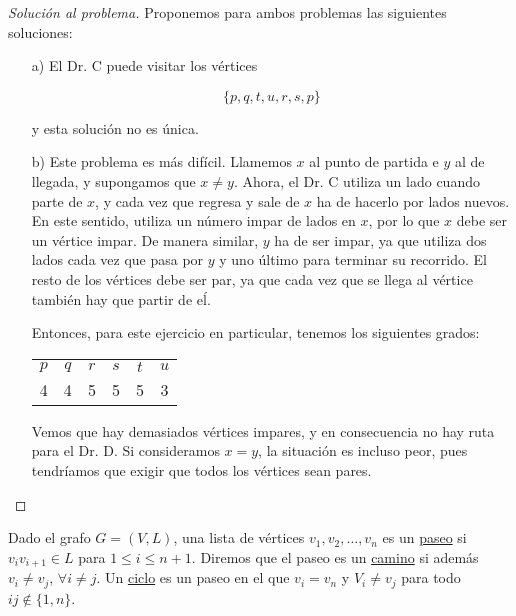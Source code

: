 \begin{proof}[Solución al problema]
    Proponemos para ambos problemas las siguientes soluciones:
    \begin{enumerate}
        \item[a)] El Dr. C puede visitar los vértices
        
        \[
        \{ p, q, t, u, r, s, p \}
        \]
        
        y esta solución no es única.
        
        \item[b)] Este problema es más difícil. Llamemos $x$ al punto de partida e $y$ al de llegada, y supongamos que $x \neq y$. Ahora, el Dr. C utiliza un lado cuando parte de $x$, y cada vez que regresa y sale de $x$ ha de hacerlo por lados nuevos. En este sentido, utiliza un número impar de lados en $x$, por lo que $x$ debe ser un vértice impar. De manera similar, $y$ ha de ser impar, ya que utiliza dos lados cada vez que pasa por $y$ y uno último para terminar su recorrido. El resto de los vértices debe ser par, ya que cada vez que se llega al vértice también hay que partir de eĺ.
        
        Entonces, para este ejercicio en particular, tenemos los siguientes grados:
        
        \begin{center}
            \begin{tabular}{cccccc}
                $p$ & $q$ & $r$ & $s$ & $t$ & $u$ \\
                4 & 4 & 5 & 5 & 5 & 3
            \end{tabular}
        \end{center}
        
        Vemos que hay demasiados vértices impares, y en consecuencia no hay ruta para el Dr. D. Si consideramos $x = y$, la situación es incluso peor, pues tendríamos que exigir que todos los vértices sean pares.
    \end{enumerate}
\end{proof}

\begin{defn}
    Dado el grafo $G=(V, L)$, una lista de vértices $v_1, v_2, \dots, v_n$ es un \ul{paseo} si $v_iv_{i+1} \in L$ para $1 \leq i \leq n+1$. Diremos que el paseo es un \ul{camino} si además $v_i \neq v_j$, $\forall i \neq j$. Un \ul{ciclo} es un paseo en el que $v_i=v_n$ y $V_i \neq v_j$ para todo $ij \notin \{1, n\}$.
\end{defn}

